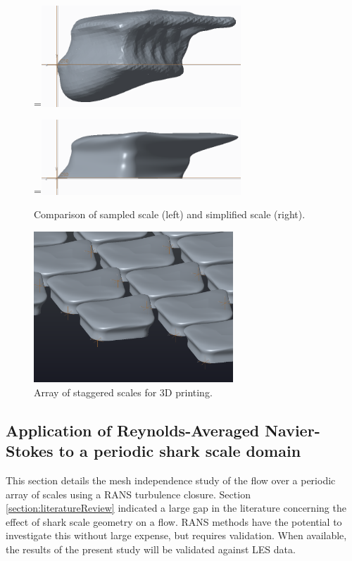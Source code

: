 \documentclass[12pt,oneside,a4paper]{article}
\newcommand*{\vcenteredhbox}[1]{\begingroup
\setbox0=\hbox{#1}\parbox{\wd0}{\box0}\endgroup}
\begin{document}
\begin{figure}[!t]
\\
\vspace{2.5cm}
\vcenteredhbox{\includegraphics[width=7.5cm]{images/Scale_Replication_14.PNG}}\hfill
\vcenteredhbox{\includegraphics[width=7.5cm]{images/Scale_Replication_13.PNG}}
\caption{Comparison of sampled scale (left) and simplified scale (right).}
\label{figure:scaleComparison}
\end{figure}

\begin{figure}[!t]
\centering
\includegraphics[width=7.5cm]{images/array_progress_report.PNG}
\caption{Array of staggered scales for 3D printing.}
\label{figure:staggeredArray}
\end{figure}

\newpage
\subsection{Application of Reynolds-Averaged Navier-Stokes to a periodic shark scale domain}
\label{section:rans}
This section details the mesh independence study of the flow over a periodic array of scales using a RANS turbulence closure. Section \ref{section:literatureReview} indicated a large gap in the literature concerning the effect of shark scale geometry on a flow. RANS methods have the potential to investigate this without large expense, but requires validation. When available, the results of the present study will be validated against LES data.
\end{document}
